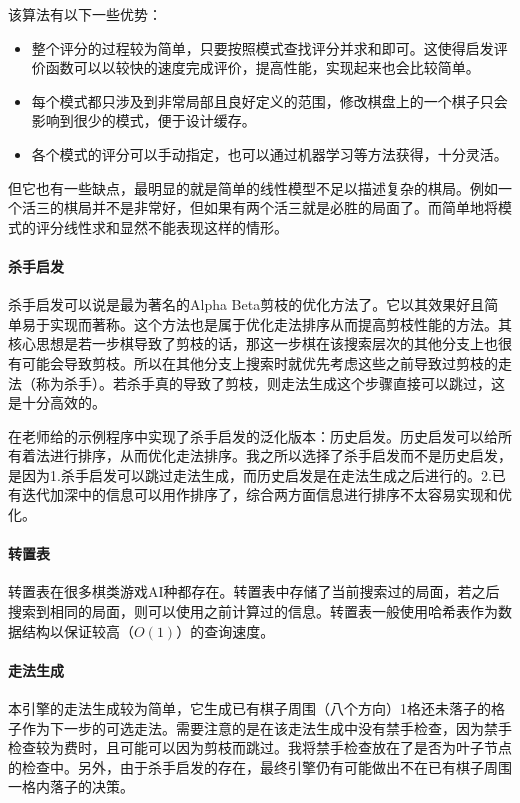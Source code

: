 \documentclass{ctexart}
\begin{document}
该算法有以下一些优势：
\begin{itemize}
    \item 整个评分的过程较为简单，只要按照模式查找评分并求和即可。这使得启发评价函数可以以较快的速度完成评价，提高性能，实现起来也会比较简单。
    \item 每个模式都只涉及到非常局部且良好定义的范围，修改棋盘上的一个棋子只会影响到很少的模式，便于设计缓存。
    \item 各个模式的评分可以手动指定，也可以通过机器学习等方法获得，十分灵活。
\end{itemize}

但它也有一些缺点，最明显的就是简单的线性模型不足以描述复杂的棋局。例如一个活三的棋局并不是非常好，但如果有两个活三就是必胜的局面了。而简单地将模式的评分线性求和显然不能表现这样的情形。

\paragraph{杀手启发} 杀手启发可以说是最为著名的Alpha Beta剪枝的优化方法了。它以其效果好且简单易于实现而著称。这个方法也是属于优化走法排序从而提高剪枝性能的方法。其核心思想是若一步棋导致了剪枝的话，那这一步棋在该搜索层次的其他分支上也很有可能会导致剪枝。所以在其他分支上搜索时就优先考虑这些之前导致过剪枝的走法（称为杀手）。若杀手真的导致了剪枝，则走法生成这个步骤直接可以跳过，这是十分高效的。

在老师给的示例程序中实现了杀手启发的泛化版本：历史启发。历史启发可以给所有着法进行排序，从而优化走法排序。我之所以选择了杀手启发而不是历史启发，是因为1.杀手启发可以跳过走法生成，而历史启发是在走法生成之后进行的。2.已有迭代加深中的信息可以用作排序了，综合两方面信息进行排序不太容易实现和优化。

\paragraph{转置表} 转置表在很多棋类游戏AI种都存在。转置表中存储了当前搜索过的局面，若之后搜索到相同的局面，则可以使用之前计算过的信息。转置表一般使用哈希表作为数据结构以保证较高（$O(1)$）的查询速度。

\paragraph{走法生成} 本引擎的走法生成较为简单，它生成已有棋子周围（八个方向）1格还未落子的格子作为下一步的可选走法。需要注意的是在该走法生成中没有禁手检查，因为禁手检查较为费时，且可能可以因为剪枝而跳过。我将禁手检查放在了是否为叶子节点的检查中。另外，由于杀手启发的存在，最终引擎仍有可能做出不在已有棋子周围一格内落子的决策。
\end{document}

